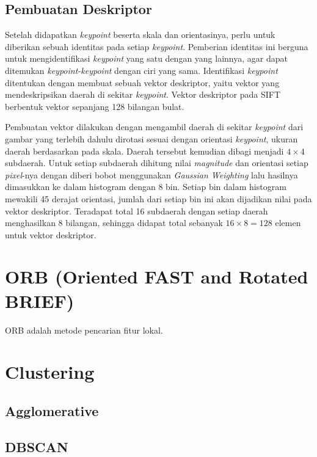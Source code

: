 \subsection{Pembuatan Deskriptor}
Setelah didapatkan \textit{keypoint} beserta skala dan orientasinya, perlu untuk diberikan sebuah identitas pada setiap \textit{keypoint}. Pemberian identitas ini berguna untuk mengidentifikasi \textit{keypoint} yang satu dengan yang lainnya, agar dapat ditemukan \textit{keypoint-keypoint} dengan ciri yang sama. Identifikasi \textit{keypoint} ditentukan dengan membuat sebuah vektor deskriptor, yaitu vektor yang mendeskripsikan daerah di sekitar \textit{keypoint}. Vektor deskriptor pada SIFT berbentuk vektor sepanjang 128 bilangan bulat.

Pembuatan vektor dilakukan dengan mengambil daerah di sekitar \textit{keypoint} dari gambar yang terlebih dahulu dirotasi sesuai dengan orientasi \textit{keypoint}, ukuran daerah berdasarkan pada skala. Daerah tersebut kemudian dibagi menjadi $4\times4$ subdaerah. Untuk setiap subdaerah dihitung nilai \textit{magnitude} dan orientasi setiap \textit{pixel}-nya dengan diberi bobot menggunakan \textit{Gaussian Weighting} lalu hasilnya dimasukkan ke dalam histogram dengan 8 bin. Setiap bin dalam histogram mewakili 45 derajat orientasi, jumlah dari setiap bin ini akan dijadikan nilai pada vektor deskriptor. Teradapat total 16 subdaerah dengan setiap daerah menghasilkan 8 bilangan, sehingga didapat total sebanyak $16\times8=128$ elemen untuk vektor deskriptor. 

\section{ORB (Oriented FAST and Rotated BRIEF)}
\label{sec:orb}

ORB adalah metode pencarian fitur lokal.

\section{Clustering}
\label{sec:clustering}

\subsection{Agglomerative}
\label{subsec:agglomerative}

\subsection{DBSCAN}
\label{subsec:dbscan}
